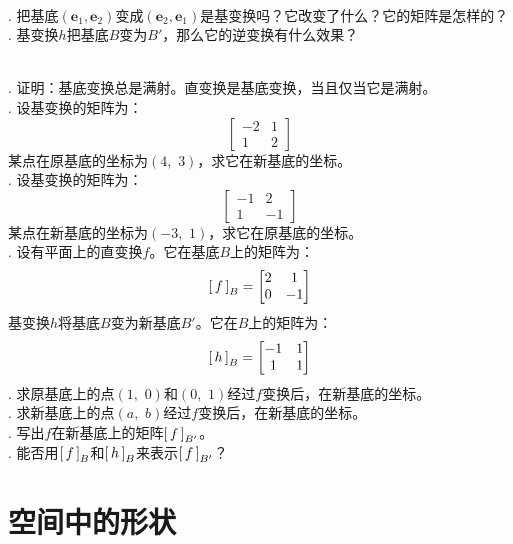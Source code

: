 \documentclass[12pt,UTF8]{ctexbook}
\begin{document}
\begin{sk}
    \mbox{} \\
    . 把基底$(\mathbf{e}_1, \mathbf{e}_2)$变成$(\mathbf{e}_2, \mathbf{e}_1)$是基变换吗？它改变了什么？它的矩阵是怎样的？\\
    . 基变换$h$把基底$B$变为$B'$，那么它的逆变换有什么效果？
\end{sk}

\begin{xt}
    \mbox{} \\
    . 证明：基底变换总是满射。直变换是基底变换，当且仅当它是满射。\\
    . 设基变换的矩阵为：
    $$
    \begin{bmatrix}
        -2 & 1 \\ 1 & 2
    \end{bmatrix}
    $$
    \indent 某点在原基底的坐标为$(4,\,\,3)$，求它在新基底的坐标。\\
    . 设基变换的矩阵为：
    $$
    \begin{bmatrix}
        -1 & 2 \\ 1 & -1
    \end{bmatrix}
    $$
    \indent 某点在新基底的坐标为$(-3,\,\,1)$，求它在原基底的坐标。\\
    . 设有平面上的直变换$f$。它在基底$B$上的矩阵为：
    $$
    \bmat{f}[B] = 
    \begin{bmatrix}
        2 & 1 \\ 0 & -1
    \end{bmatrix}
    $$
    \indent 基变换$h$将基底$B$变为新基底$B'$。它在$B$上的矩阵为：
    $$
    \bmat{h}[B] = 
    \begin{bmatrix}
        -1 & 1 \\ 1 & 1
    \end{bmatrix}
    $$
    . 求原基底上的点$(1,\,\,0)$和$(0,\,\,1)$经过$f$变换后，在新基底的坐标。\\
    . 求新基底上的点$(a,\,\,b)$经过$f$变换后，在新基底的坐标。\\
    . 写出$f$在新基底上的矩阵$\bmat{f}[B']$。\\
    . 能否用$\bmat{f}[B]$和$\bmat{h}[B]$来表示$\bmat{f}[B']$？
\end{xt}

\chapter{空间中的形状}
\end{document}
